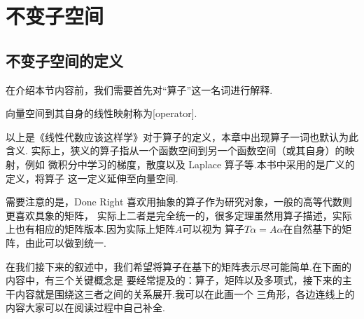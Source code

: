 \chapter{不变子空间}

\section{不变子空间的定义}
在介绍本节内容前，我们需要首先对``算子''这一名词进行解释.
\begin{definition}
    向量空间到其自身的线性映射称为[operator].
\end{definition}
以上是《线性代数应该这样学》对于算子的定义，本章中出现算子一词也默认为此含义.
实际上，狭义的算子指从一个函数空间到另一个函数空间（或其自身）的映射，例如
微积分中学习的梯度，散度以及 Laplace 算子等.本书中采用的是广义的定义，将算子
这一定义延伸至向量空间.

需要注意的是，Done Right 喜欢用抽象的算子作为研究对象，一般的高等代数则更喜欢具象的矩阵，
实际上二者是完全统一的，很多定理虽然用算子描述，实际上也有相应的矩阵版本.因为实际上矩阵$A$可以视为
算子$T\alpha=A\alpha$在自然基下的矩阵，由此可以做到统一.

在我们接下来的叙述中，我们希望将算子在基下的矩阵表示尽可能简单.在下面的内容中，有三个关键概念是
要经常提及的：算子，矩阵以及多项式，接下来的主干内容就是围绕这三者之间的关系展开.我可以在此画一个
三角形，各边连线上的内容大家可以在阅读过程中自己补全.

\begin{figure}[h]
    \centering
\end{figure}

